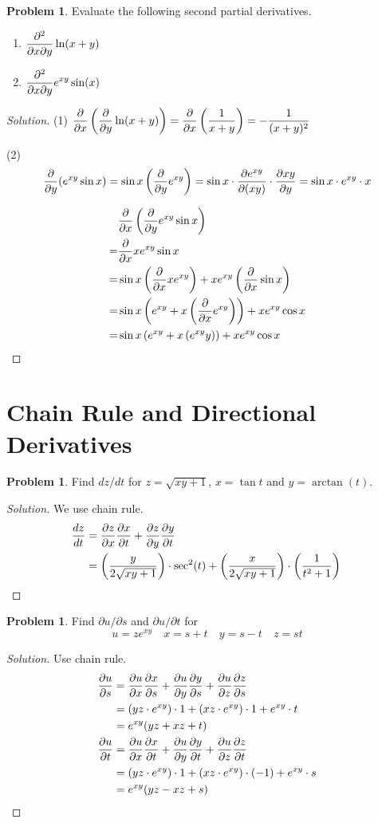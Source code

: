\documentclass[12pt]{amsart}%
\theoremstyle{plain}
\theoremstyle{definition}
\newtheorem{prob}[theorem]{Problem}
\newcommand{\pt}[1]{{\partial \over \partial #1}}
\newcommand{\p}[0]{\partial}
\theoremstyle{special}
\newcommand{\sol}[1]{
{\begin{proof}[Solution]#1\end{proof}}
}
\newcommand{\Prob}[1]{\begin{tcolorbox}%
\begin{prob}
	#1
\end{prob}
\end{tcolorbox}	
}
\begin{document}
\Prob{
Evaluate the following second partial derivatives.
\begin{enumerate}
	\item $\displaystyle{{\partial^2\over \partial x\partial y}\ln(x+y)}$\vspace{0.5cm}
	\item $\displaystyle{{\partial^2\over \partial x\partial y}e^{xy}\sin(x)}$
\end{enumerate}
}
\sol{
(1)
\(\displaystyle
 {\partial \over \partial x}\left({\partial\over\partial y}\ln(x+y)\right)	=\pt x\left({1\over x+y}\right)
 =-{1\over (x+y)^2}
 \)
 
 (2)\begin{align*}
\pt y(e^{xy}\sin x)=\sin x\left(\pt y e^{xy}\right)=\sin x\cdot{\partial e^{xy}\over \partial (xy)}\cdot {\partial xy\over \partial y}=\sin x\cdot e^{xy}\cdot x
\end{align*}

\begin{align*}
&\pt x\left(\pt y e^{xy}\sin x\right)\\
=&\pt xxe^{xy}\sin x\\
=&\sin x\left(\pt x xe^{xy}\right)+xe^{xy}\left(\pt x \sin x\right)\\
=&\sin x\left(e^{xy}+ x\left(\pt x e^{xy}\right)\right)+xe^{xy}\cos x\\
=&\sin x\left(e^{xy}+x\left(e^{xy}y\right)\right)+xe^{xy}\cos x
\qedhere\end{align*}
}\bigskip
\section{Chain Rule and Directional Derivatives}
\Prob{Find $dz/dt$ for $z=\sqrt{xy+1}$, $x=\tan t$ and $y=\arctan(t)$.}
\sol{We use chain rule.
\begin{align*}
{dz\over dt}&={\partial z\over\partial x}{\partial x\over \partial t}+{\partial z\over\partial y}{\partial y\over \partial t}	\\
&=\left(y\over 2\sqrt{xy+1}\right)\cdot\sec^2(t)+\left(x\over 2\sqrt{xy+1}\right)\cdot\left(1\over t^2+1\right)\qedhere
\end{align*}
}
\Prob{Find $\partial u/\partial s$ and $\partial u/\partial t$ for
\[u=ze^{xy}\quad x=s+t\quad y=s-t\quad z=st\]}
\sol{Use chain rule.
\begin{align*}{\p u\over \p s}&=
{\p u\over \p x}{\p x\over \p s}+{\p u\over \p y}{\p y\over \p s}+{\p u\over \p z}{\p z\over\p s}\\
&=\left(yz\cdot e^{xy}\right)\cdot 1+ \left(xz\cdot e^{xy}\right)\cdot 1+e^{xy}\cdot t\\
&=e^{xy}(yz+xz+t)\\
{\p u\over \p t}&=
{\p u\over \p x}{\p x\over \p t}+{\p u\over \p y}{\p y\over \p t}+{\p u\over \p z}{\p z\over\p t}\\
&=\left(yz\cdot e^{xy}\right)\cdot 1+ \left(xz\cdot e^{xy}\right)\cdot (-1)+e^{xy}\cdot s\\
&=e^{xy}(yz-xz+s)\qedhere
\end{align*}
}
\end{document}
